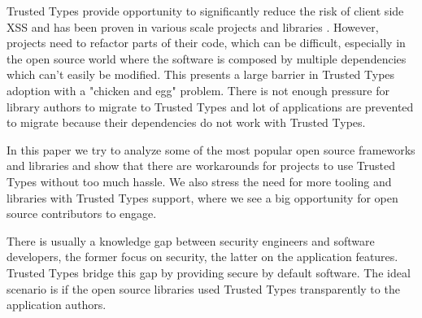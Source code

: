 Trusted Types provide opportunity to significantly reduce the risk of client side XSS and has been
proven in various scale projects and libraries \cite{tt_web_framework_paper}
\cite{tt_integration_list}. However, projects need to refactor parts of their code, which can be
difficult, especially in the open source world where the software is composed by multiple
dependencies which can't easily be modified. This presents a large barrier in Trusted Types adoption
\cite{tt_web_framework_paper} with a "chicken and egg" problem. There is not enough pressure for
library authors to migrate to Trusted Types and lot of applications are prevented to migrate because
their dependencies do not work with Trusted Types.

In this paper we try to analyze some of the most popular open source frameworks and libraries and
show that there are workarounds for projects to use Trusted Types without too much hassle. We
also stress the need for more tooling and libraries with Trusted Types support, where we see a big
opportunity for open source contributors to engage.

There is usually a knowledge gap between security engineers and software developers, the former
focus on security, the latter on the application features. Trusted Types bridge this gap by
providing secure by default software. The ideal scenario is if the open source libraries used
Trusted Types transparently to the application authors.
